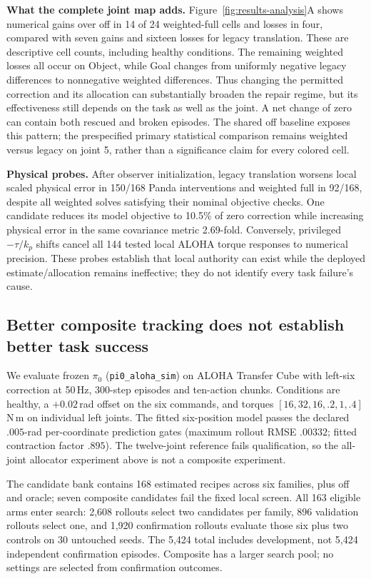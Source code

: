 \documentclass{article}
\newcommand{\code}[1]{\texttt{\small #1}}
\begin{document}
\textbf{What the complete joint map adds.} Figure~\ref{fig:results-analysis}A shows
numerical gains over off in 14 of 24 weighted-full cells and losses in four, compared with
seven gains and sixteen losses for legacy translation. These are descriptive cell counts,
including healthy conditions. The remaining weighted losses all occur on Object, while
Goal changes from uniformly negative legacy differences to nonnegative weighted differences.
Thus changing the permitted correction and its allocation can substantially broaden the
repair regime, but its effectiveness still depends on the task as well as the joint.
A net change of zero can contain both rescued and broken episodes. The shared off baseline
exposes this pattern; the prespecified primary statistical comparison remains weighted
versus legacy on joint 5, rather than a significance claim for every colored cell.

\textbf{Physical probes.} After observer initialization, legacy translation worsens local
scaled physical error in 150/168 Panda interventions and weighted full in 92/168, despite
all weighted solves satisfying their nominal objective checks. One candidate reduces its
model objective to 10.5\% of zero correction while increasing physical error in the same
covariance metric 2.69-fold. Conversely, privileged $-\tau/k_p$ shifts cancel all 144 tested
local ALOHA torque responses to numerical precision. These probes establish that local
authority can exist while the deployed estimate/allocation remains ineffective; they do not
identify every task failure's cause.

\subsection{Better composite tracking does not establish better task success}
We evaluate frozen $\pi_0$ (\code{pi0\_aloha\_sim}) on ALOHA Transfer Cube with left-six
correction at 50\,Hz, 300-step episodes and
ten-action chunks. Conditions are healthy, a $+0.02$\,rad offset on the six commands, and
torques $[16,32,16,.2,1,.4]$\,N\,m on individual left joints. The fitted six-position model
passes the declared $.005$-rad per-coordinate prediction gates (maximum rollout RMSE
$.00332$; fitted contraction factor $.895$). The twelve-joint reference fails qualification,
so the all-joint allocator experiment above is not a composite experiment.

The candidate bank contains 168 estimated recipes across six families, plus off and oracle;
seven composite candidates fail the fixed local screen. All 163 eligible arms enter search:
2,608 rollouts select two candidates per family, 896 validation rollouts select one, and
1,920 confirmation rollouts evaluate those six plus two controls on 30 untouched seeds.
The 5,424 total includes development, not 5,424 independent confirmation episodes.
Composite has a larger search pool; no settings are selected from confirmation outcomes.
\end{document}
